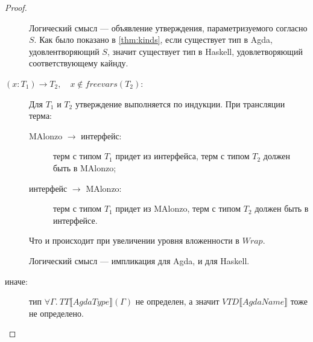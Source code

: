 \begin{proof}
\begin{description}
   Логический смысл --- объявление утверждения, параметризуемого согласно \(S\). Как было
   показано в \ref{thm:kinds}, если существует тип в Agda, удовлентворяющий \(S\),
   значит существует тип в Haskell, удовлетворяющий соответствующему кайнду.
\item[\((x : T_1) \rightarrow T_2,\quad x \not\in freevars(T_2)\):]
   Для \(T_1\) и \(T_2\) утверждение выполняется по индукции. При трансляции терма:
   \begin{description}
   \item[MAlonzo \(\rightarrow\) интерфейс:]
      терм с типом \(T_1\) придет из интерфейса, терм с типом \(T_2\) должен быть в MAlonzo;
   \item[интерфейс \(\rightarrow\) MAlonzo:]
      терм с типом \(T_1\) придет из MAlonzo, терм с типом \(T_2\) должен быть в интерфейсе.
   \end{description}
   Что и происходит при увеличении уровня вложенности в \(Wrap\).
   
   Логический смысл --- импликация для Agda, и для Haskell.
\item[\textnormal{иначе}:]
   тип \(\forall \Gamma.\ TT\llbracket AgdaType \rrbracket(\Gamma)\)
   не определен, а значит \(VTD\llbracket AgdaName \rrbracket\) тоже
   не определено.
\end{description}
\end{proof}
